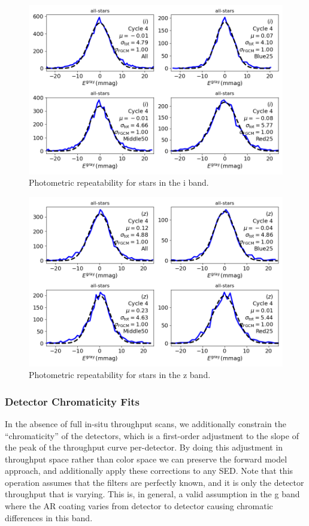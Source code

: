 \begin{figure}
  \includegraphics{photometric_calibration_figures/repeatability_i.png}
  \caption{Photometric repeatability for stars in the i band.}
\end{figure}

\begin{figure}
  \includegraphics{photometric_calibration_figures/repeatability_z.png}
  \caption{Photometric repeatability for stars in the z band.}
\end{figure}

\subsubsection{Detector Chromaticity Fits}

In the absence of full in-situ throughput scans, we additionally constrain the
``chromaticity'' of the detectors, which is a first-order adjustment to the
slope of the peak of the throughput curve per-detector.  By doing this
adjustment in throughput space rather than color space we can preserve the
forward model approach, and additionally apply these corrections to any
SED. Note that this operation assumes that the filters are perfectly known, and
it is only the detector throughput that is varying.  This is, in general, a
valid assumption in the g band where the AR coating varies from detector to
detector causing chromatic differences in this band.

